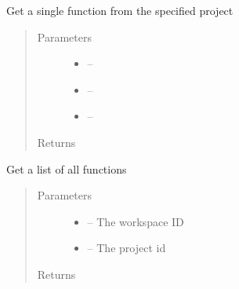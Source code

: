 \documentclass[letterpaper,10pt,english]{sphinxmanual}
\begin{document}
\begin{fulllineitems}
\label{_source/son_editor.impl:son_editor.impl.functionsimpl.get_function_project}
Get a single function from the specified project
\begin{quote}\begin{description}
\item[{Parameters}] \leavevmode\begin{itemize}
\item {} 
 -- 

\item {} 
 -- 

\item {} 
 -- 

\end{itemize}

\item[{Returns}] \leavevmode


\end{description}\end{quote}

\end{fulllineitems}


\begin{fulllineitems}
\label{_source/son_editor.impl:son_editor.impl.functionsimpl.get_functions}
Get a list of all functions
\begin{quote}\begin{description}
\item[{Parameters}] \leavevmode\begin{itemize}
\item {} 
 -- The workspace ID

\item {} 
 -- The project id

\end{itemize}

\item[{Returns}] \leavevmode


\end{description}\end{quote}

\end{fulllineitems}
\end{document}
